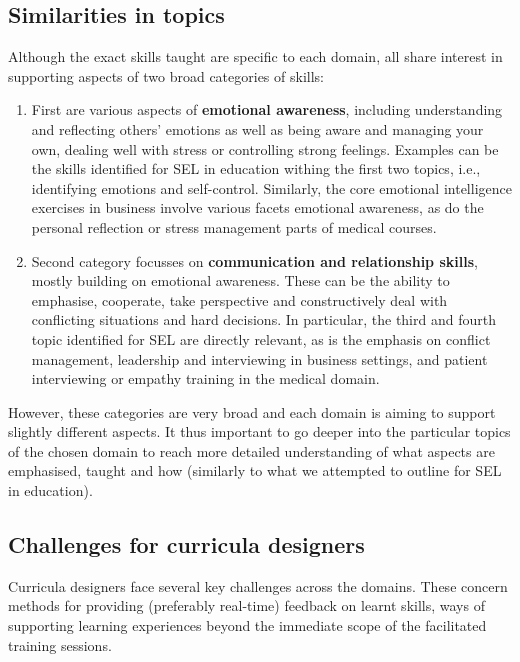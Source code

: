 \documentclass[prodmode,acmtochi]{acmsmall}
\begin{document}
\iffalse 
\subsection*{Similarities in topics} Although the exact skills taught are specific to each domain, all share interest in supporting aspects of two broad categories of skills: 
\begin{enumerate}
        \item First are various aspects of {\bf emotional awareness}, including understanding and reflecting others' emotions as well as being aware and managing your own, dealing well with stress or controlling strong feelings. Examples can be the skills identified for SEL in education withing the first two topics, i.e., identifying emotions and self-control. Similarly, the core emotional intelligence exercises in business involve various facets emotional awareness, as do the personal reflection or stress management parts of medical courses. 
        \item Second category focusses on {\bf communication and relationship skills}, mostly building on emotional awareness. These can be the ability to emphasise, cooperate, take perspective and constructively deal with conflicting situations and hard decisions. In particular, the third and fourth topic identified for SEL are directly relevant, as is the emphasis on conflict management, leadership and interviewing in business settings, and patient interviewing or empathy training  in the medical domain. 
\end{enumerate} 

However, these categories are very broad and each domain is aiming to support slightly different aspects. It thus important to go deeper into the particular topics of the chosen domain to reach more detailed understanding of what aspects are emphasised, taught and how (similarly to what we attempted to outline for SEL in education). 


\subsection*{Challenges for curricula designers}
Curricula designers face several key challenges across the domains. These concern methods for providing (preferably real-time) feedback on learnt skills, ways of supporting learning experiences beyond the immediate scope of the facilitated training sessions.  
\end{document}
